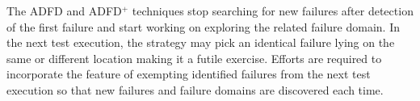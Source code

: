 The ADFD and ADFD$^+$ techniques stop searching for new failures after detection of the first failure and start working on exploring the related failure domain. In the next test execution, the strategy may pick an identical failure lying on the same or different location making it a futile exercise. Efforts are required to incorporate the feature of exempting identified failures from the next test execution so that new failures and failure domains are discovered each time.\\





